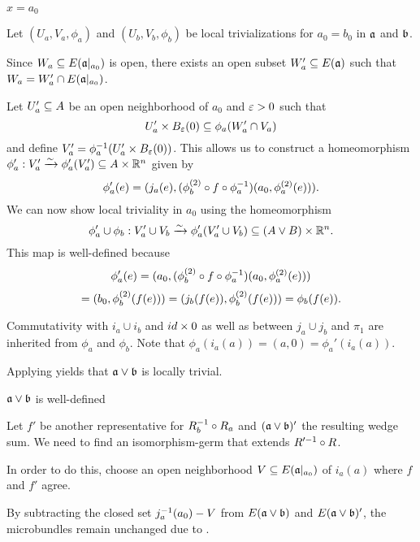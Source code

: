 \begin{myproof}
\begin{sectionize}
\begin{caselist}
            \item $x = a_0$
            
            Let $(U_a, V_a, \phi_a)$ and $(U_b, V_b, \phi_b)$ be local trivializations
            for $a_0 = b_0$ in $\mathfrak{a}$ and $\bb$.

            Since $W_a \subseteq{} E(\mathfrak{a}\vert_{a_0})$ is open,
            there exists an open subset
            $W_a' \subseteq{} E(\mathfrak{a})$ such that $W_a = W_a' \cap E(\mathfrak{a}\vert_{a_0})$.

            Let $U_a' \subseteq{} A$ be an open neighborhood of $a_0$ and $\varepsilon{} > 0$ such that
            \[ U_a' \cross \ball[\eps] \sub \phi_a(W_a' \cap V_a) \]
            and define $V_a' = \inv{\phi_a}(U_a' \cross \ball[\eps])$.
            This allows us to construct a homeomorphism
            $\phi_a': V_a' \xrightarrow{\sim} \phi_a'(V_a') \subseteq{} A \times \mathbb{R}^n$ given by
            \[ \phi_a'(e) = (j_a(e), (\phi_b^{(2)} \circ f \circ \phi_a^{-1})(a_0, \phi_a^{(2)}(e))). \]
            We can now show local triviality in $a_0$ using the homeomorphism
            \[ \phi_a' \cup \phi_b: V_a' \cup V_b \xrightarrow{\sim} \phi_a'(V_a' \cup V_b) \subseteq{} (A \vee B) \times \mathbb{R}^n. \]
            This map is well-defined because
            \[ \phi_a'(e) = (a_0, (\phi_b^{(2)} \circ f \circ \phi_a^{-1})(a_0, \phi_a^{(2)}(e))) \]
            \[ = (b_0, \phi_b^{(2)}(f(e))) = (j_b(f(e)), \phi_b^{(2)}(f(e))) = \phi_b(f(e)). \]

            Commutativity with $i_a \cup i_b$ and $id \times 0$
            as well as between $j_a \cup j_b$ and $\pi_1$
            are inherited from $\phi_a$ and $\phi_b$.
            Note that $\phi_a(i_a(a)) = (a, 0) = \phi_a'(i_a(a))$.

            Applying  yields that $\ba \vee \bb$ is locally trivial.
        \end{caselist}
        
        \item $\ba \vee \bb$ is well-defined

        Let $f'$ be another representative for $R_b^{-1} \circ R_a$ and $(\ba \vee \bb)'$ the resulting wedge sum.
        We need to find an isomorphism-germ that extends $R'^{-1} \circ R$.
        
        In order to do this,
        choose an open neighborhood $V \subseteq{} E(\mathfrak{a}\vert_{a_0})$
        of $i_a(a)$ where $f$ and $f'$ agree.
        
        By subtracting the closed set $j_a^{-1}(a_0) - V$
        from $E(\ba \vee \bb)$ and $E(\ba \vee \bb)'$,
        the microbundles remain unchanged due to .
        

\end{sectionize}
\end{myproof}
